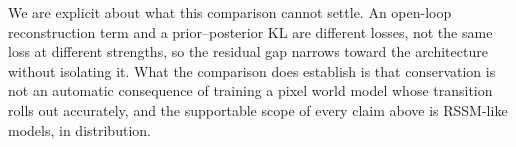 We are explicit about what this comparison cannot settle. An open-loop reconstruction term and a
prior--posterior KL are different losses, not the same loss at different strengths, so the residual
gap narrows toward the architecture without isolating it. What the comparison does establish is that
conservation is not an automatic consequence of training a pixel world model whose transition rolls
out accurately, and the supportable scope of every claim above is RSSM-like models, in distribution.
